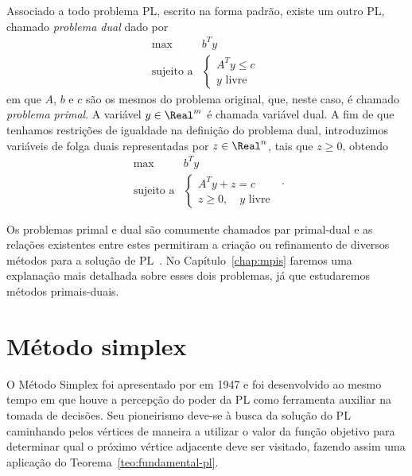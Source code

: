 Associado a todo problema \ac{PL}, escrito na forma padrão, existe um outro \ac{PL}, chamado \emph{problema dual} dado por
\begin{equation*}
\begin{array}{lc}
\displaystyle \max & b^Ty \\
\text{sujeito a} &\begin{cases} A^Ty \leq c \\
				 y \text{ livre}	
				 \end{cases}\
\end{array}
\end{equation*}
em que $A$, $b$ e $c$ são os mesmos do problema original, que, neste caso, é chamado \emph{problema primal}.
A variável $y\in\Real^{m}$ é chamada variável dual. A fim de que tenhamos restrições de igualdade na definição do problema dual, introduzimos  variáveis de folga duais representadas por $z\in\Real^{n}$, tais que $z\geq 0$, obtendo 
\begin{equation}
\begin{array}{lc}
\displaystyle \max & b^Ty \\
\text{sujeito a} &\begin{cases} A^Ty +z =  c \\
				 z\geq 0, \quad y \text{ livre}	
				 \end{cases}\
\end{array}.
\label{eq:introPL-dual}
\end{equation}


Os problemas primal e dual são comumente chamados par primal-dual e as relações existentes entre estes permitiram a criação ou refinamento de diversos métodos para a solução de \ac{PL}~\cite{Bazaraa:2009uu}. No Capítulo~\ref{chap:mpis} faremos uma explanação mais detalhada sobre esses dois problemas, já que estudaremos métodos primais-duais.

\section{Método simplex}


O Método Simplex foi apresentado por
\textcite{Dantzig:Maximization-of-a-linear:1951y} em 1947 e foi desenvolvido ao
mesmo tempo em que houve a percepção do poder da \ac{PL} como ferramenta auxiliar na
tomada de decisões. Seu pioneirismo deve-se à busca da solução do \ac{PL}
caminhando pelos vértices de maneira a utilizar o valor da função objetivo para determinar qual o próximo vértice adjacente deve ser
visitado, fazendo assim uma aplicação do Teorema~\ref{teo:fundamental-pl}.

